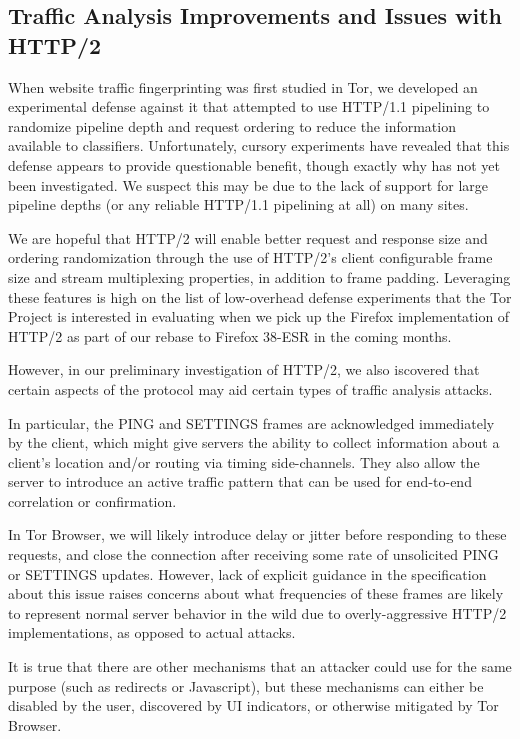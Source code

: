 \documentclass[letterpaper,11pt]{llncs}
\begin{document}
\subsection{Traffic Analysis Improvements and Issues with HTTP/2}

When website traffic fingerprinting was first studied in Tor, we developed an
experimental defense against it that attempted to use HTTP/1.1 pipelining to
randomize pipeline depth and request ordering to reduce the information
available to classifiers\cite{blog-pipelining}. Unfortunately, cursory
experiments have revealed that this defense appears to provide questionable
benefit, though exactly why has not yet been investigated. We suspect this may
be due to the lack of support for large pipeline depths (or any reliable
HTTP/1.1 pipelining at all) on many sites.

We are hopeful that HTTP/2 will enable better request and response size and
ordering randomization through the use of HTTP/2's client configurable frame
size and stream multiplexing properties, in addition to frame padding.
Leveraging these features is high on the list of low-overhead defense
experiments that the Tor Project is interested in evaluating when we pick up
the Firefox implementation of HTTP/2 as part of our rebase to Firefox 38-ESR
in the coming months.

However, in our preliminary investigation of HTTP/2, we also iscovered that
certain aspects of the protocol may aid certain types of traffic analysis
attacks.

In particular, the PING and SETTINGS frames are acknowledged immediately by
the client, which might give servers the ability to collect information about a
client's location and/or routing via timing side-channels. They also allow the
server to introduce an active traffic pattern that can be used for end-to-end
correlation or confirmation.

In Tor Browser, we will likely introduce delay or jitter before responding to
these requests, and close the connection after receiving some rate of
unsolicited PING or SETTINGS updates. However, lack of explicit guidance in
the specification about this issue raises concerns about what frequencies of
these frames are likely to represent normal server behavior in the wild due to
overly-aggressive HTTP/2 implementations, as opposed to actual attacks.

It is true that there are other mechanisms that an attacker could use for the
same purpose (such as redirects or Javascript), but these mechanisms can
either be disabled by the user, discovered by UI indicators, or otherwise
mitigated by Tor Browser.
\end{document}
